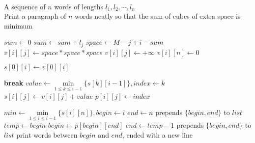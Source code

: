 \documentclass{article}
\begin{document}
\begin{algorithm}[H]
	\begin{algorithmic}
		\Require \\
			A sequence of $n$ words of lengths $l_1,l_2,\cdots,l_n$
		\Ensure \\
			Print a paragraph of $n$ words neatly so that the sum of cubes of extra space is minimum

        \State $sum \gets 0$
            \State $sum \gets sum + l_j$
            \State $space \gets M - j + i - sum$
                \State $v[i][j] \gets space * space * space$
            \Else
                \State $v[i][j] \gets +\infty$
            \EndIf
        \EndFor
            \State $v[i][n] \gets 0$
        \EndIf
		\EndFor

        \State $s[0][i] \gets v[0][i]$
    \EndFor

                \State \textbf{break}
            \EndIf
            \State $value \gets \min\limits_{1\leqslant k\leqslant i-1}\{s[k][i-1]\}, index \gets k$
            \State $s[i][j] \gets v[i][j] + value$
            \State $p[i][j] \gets index$
        \EndFor
    \EndFor

    \State $min \gets \min\limits_{1\leqslant i\leqslant i-1}\{s[i][n]\}, begin \gets i$
    \State $end \gets n$
        \State prepends $\{begin,end\}$ to $list$
        \State $temp \gets begin$
        \State $begin \gets p[begin][end]$
        \State $end \gets temp - 1$
    \EndWhile
    \State prepends $\{begin,end\}$ to $list$
		\State print words between $begin$ and $end$, ended with a new line
	\EndFor	
	\end{algorithmic}
\end{algorithm}
\end{document}
